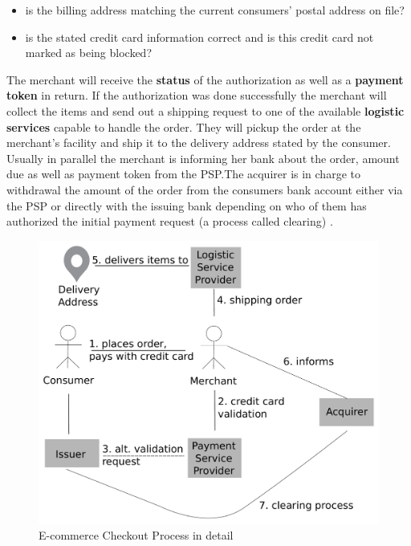 \begin{itemize}
    \item is the billing address matching the current consumers' postal address on file?
    \item is the stated credit card information correct and is this credit card not marked as being blocked?
\end{itemize}

The merchant will receive the \textbf{status} of the authorization as well as a \textbf{payment token} in return. If the authorization was done successfully the merchant will collect the items and send out a shipping request to one of the available \textbf{logistic services} capable to handle the order. They will pickup the order at the merchant's facility and ship it to the delivery address stated by the consumer. Usually in parallel the merchant is informing her bank about the order, amount due as well as payment token from the PSP.\@ The acquirer is in charge to withdrawal the amount of the order from the consumers bank account either via the PSP or directly with the issuing bank depending on who of them has authorized the initial payment request (a process called clearing) \citep{VisaPayment2014}.\@

\begin{figure}[H]
	\centering
		\includegraphics[width=0.8\columnwidth]{images/e-commerce-checkout-process.pdf}
	\caption{E-commerce Checkout Process in detail}
\label{fig:images_ecommerce_checkout_process}
\end{figure}

